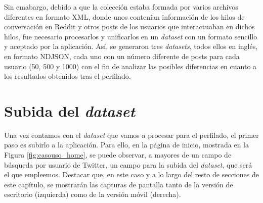 \bigskip
Sin emabargo, debido a que la colección estaba formada por varios archivos diferentes en formato XML, donde unos contenían información de los hilos
de conversación en Reddit y otros posts de los usuarios que interactuaban en dichos hilos, fue necesario procesarlos y unificarlos
en un \textit{dataset} con un formato sencillo y aceptado por la aplicación. Así, se generaron tres \textit{datasets}, todos ellos
en inglés, en formato NDJSON, cada uno con 
un número diferente de posts para cada usuario (50, 500 y 1000) con el fin de analizar las posibles diferencias en cuanto a los resultados
obtenidos tras el perfilado.

\section{Subida del \textit{dataset}}

Una vez contamos con el \textit{dataset} que vamos a procesar para el perfilado, el primer paso es subirlo a la aplicación. Para ello,
en la página de inicio, mostrada en la Figura \ref{fig:casouso_home}, se puede observar, a mayores de un
campo de búsqueda por usuario de Twitter, un campo para la subida del \textit{dataset}, que será el que empleemos.
Destacar que, en este caso y a lo largo del resto de secciones de este capítulo,
se mostrarán las capturas de pantalla tanto de la versión de escritorio (izquierda) como de la versión móvil (derecha).

